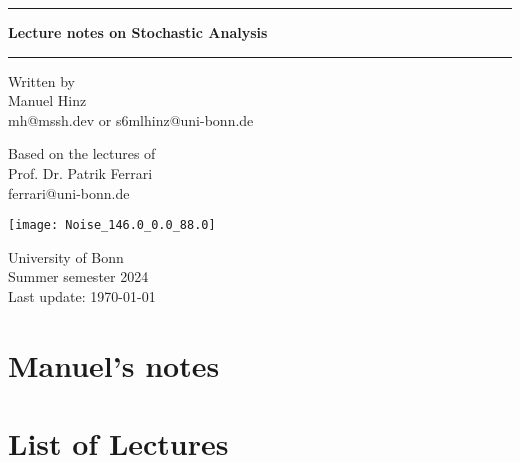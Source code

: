 \documentclass[a4paper, 10pt, oneside]{book}
\author{Manuel Hinz}
\begin{document}
\pagecolor{mycolor}
\begin{titlepage}
    \centering

    \vspace*{1cm}

    \rule{\textwidth}{1pt}

    \vspace{.7\baselineskip}
    {\huge \textbf{Lecture notes on Stochastic Analysis}}

    
    \rule{\textwidth}{1pt}

    \vspace{1.5cm}

    \large

    \begin{minipage}{.5\textwidth}
        \centering
        Written by \\
        Manuel Hinz\\
        {\normalsize mh@mssh.dev or s6mlhinz@uni-bonn.de}
    \end{minipage}%
    \begin{minipage}{.5\textwidth}
        \centering
        Based on the lectures of\\
        Prof. Dr. Patrik Ferrari \\
        {\normalsize ferrari@uni-bonn.de}
    \end{minipage}


    \vspace{3cm}

    \texttt{[image: Noise\_146.0\_0.0\_88.0]}

    \vfill

    University of Bonn \\
    Summer semester 2024\\
    Last update: \today
   
\end{titlepage}
\pagecolor{white}
\tableofcontents
\restoregeometry
\setcounter{chapter}{-1}
\chapter{Manuel's notes}






\chapter*{List of Lectures}
\begin{itemize}
    \renewcommand*{\do}[1]{\item \hyperlink{#1}{Lecture \StrBehind{#1}{c}:} }
    \dolistloop{\lecturelist}
\end{itemize}
\end{document}
